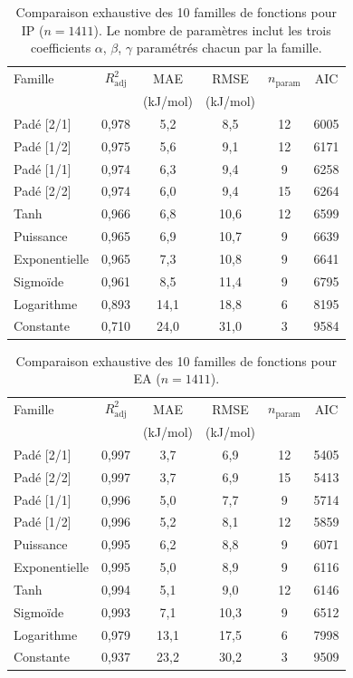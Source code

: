 \begin{table}[htbp]
\centering
\footnotesize
\caption{Comparaison exhaustive des 10 familles de fonctions pour IP ($n = 1411$). Le nombre de paramètres inclut les trois coefficients $\alpha$, $\beta$, $\gamma$ paramétrés chacun par la famille.}
\label{tab:s4_ip_families}
\begin{tabular}{lccccc}
\toprule
Famille & $R^2_{\mathrm{adj}}$ & MAE & RMSE & $n_{\mathrm{param}}$ & AIC \\
 & & (kJ/mol) & (kJ/mol) & & \\
\midrule
Padé [2/1] & 0,978 & 5,2 & 8,5 & 12 & 6005 \\
Padé [1/2] & 0,975 & 5,6 & 9,1 & 12 & 6171 \\
Padé [1/1] & 0,974 & 6,3 & 9,4 & 9 & 6258 \\
Padé [2/2] & 0,974 & 6,0 & 9,4 & 15 & 6264 \\
Tanh & 0,966 & 6,8 & 10,6 & 12 & 6599 \\
Puissance & 0,965 & 6,9 & 10,7 & 9 & 6639 \\
Exponentielle & 0,965 & 7,3 & 10,8 & 9 & 6641 \\
Sigmoïde & 0,961 & 8,5 & 11,4 & 9 & 6795 \\
Logarithme & 0,893 & 14,1 & 18,8 & 6 & 8195 \\
Constante & 0,710 & 24,0 & 31,0 & 3 & 9584 \\
\bottomrule
\end{tabular}
\end{table}

\begin{table}[htbp]
\centering
\footnotesize
\caption{Comparaison exhaustive des 10 familles de fonctions pour EA ($n = 1411$).}
\label{tab:s4_ea_families}
\begin{tabular}{lccccc}
\toprule
Famille & $R^2_{\mathrm{adj}}$ & MAE & RMSE & $n_{\mathrm{param}}$ & AIC \\
 & & (kJ/mol) & (kJ/mol) & & \\
\midrule
Padé [2/1] & 0,997 & 3,7 & 6,9 & 12 & 5405 \\
Padé [2/2] & 0,997 & 3,7 & 6,9 & 15 & 5413 \\
Padé [1/1] & 0,996 & 5,0 & 7,7 & 9 & 5714 \\
Padé [1/2] & 0,996 & 5,2 & 8,1 & 12 & 5859 \\
Puissance & 0,995 & 6,2 & 8,8 & 9 & 6071 \\
Exponentielle & 0,995 & 5,0 & 8,9 & 9 & 6116 \\
Tanh & 0,994 & 5,1 & 9,0 & 12 & 6146 \\
Sigmoïde & 0,993 & 7,1 & 10,3 & 9 & 6512 \\
Logarithme & 0,979 & 13,1 & 17,5 & 6 & 7998 \\
Constante & 0,937 & 23,2 & 30,2 & 3 & 9509 \\
\bottomrule
\end{tabular}
\end{table}

